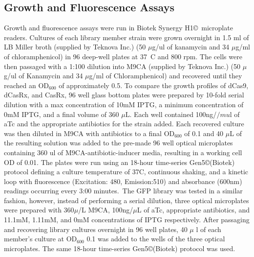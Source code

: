 \documentclass[times]{zHenriquesLab-StyleBioRxiv}
\begin{document}
\subsection{Growth and Fluorescence Assays}
Growth and fluorescence assays were run in Biotek Synergy H1\copyright\ microplate readers. Cultures of each library member strain were grown overnight in 1.5 ml of LB Miller broth (supplied by Teknova Inc.) (50 {$\mu$}g/ul of kanamycin and 34 {$\mu$}g/ml of chloramphenicol) in 96 deep-well plates at 37\degree\ C and 800 rpm. The cells were then passaged with a 1:100 dilution into M9CA (supplied by Teknova Inc.) (50 {$\mu$}g/ul of Kanamycin and 34 {$\mu$}g/ml of Chloramphenicol) and recovered until they reached an $\text{OD}_{600}$ of approximately 0.5. To compare the growth profiles of dCas9, dCasRx, and CasRx, 96 well glass bottom plates were prepared by 10-fold serial dilution with a max concentration of 10mM IPTG, a minimum concentration of 0mM IPTG, and a final volume of 360 $\mu$L. Each well contained 100ng/$/mu$l of aTc and the appropriate antibiotics for the strain added. Each recovered culture was then diluted in M9CA with antibiotics to a final $\text{OD}_{600}$ of 0.1 and 40 $\mu$L of the resulting solution was added to the pre-made 96 well optical microplates containing 360 ul of M9CA-antibiotic-inducer media, resulting in a working cell OD of 0.01. The plates were run using an 18-hour time-series Gen5\copyright(Biotek) protocol defining a culture temperature of 37C, continuous shaking, and a kinetic loop with fluorescence (Excitation: 480, Emission:510) and absorbance (600nm) readings occurring every 3:00 minutes.\ The GFP library was tested in a similar fashion, however, instead of performing a serial dilution, three optical microplates were prepared with 360$\mu$/L M9CA, 100ng/$\mu$L of aTc, appropriate antibiotics, and 11.1mM, 1.11mM, and 0mM concentrations of IPTG respectively. After passaging and recovering library cultures overnight in 96 well plates, 40 $\mu$ l of each member's culture at $\text{OD}_{600}$ 0.1 was added to the wells of the three optical microplates. The same 18-hour time-series Gen5\copyright(Biotek) protocol was used. 
\end{document}
